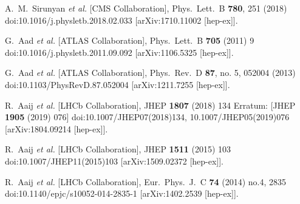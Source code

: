 \documentclass[12pt]{article}
\begin{document}
\begin{thebibliography}{1}
  A.~M.~Sirunyan {\it et al.} [CMS Collaboration],
  Phys.\ Lett.\ B {\bf 780}, 251 (2018)
  doi:10.1016/j.physletb.2018.02.033
  [arXiv:1710.11002 [hep-ex]].


  G.~Aad {\it et al.} [ATLAS Collaboration],
  Phys.\ Lett.\ B {\bf 705} (2011) 9
  doi:10.1016/j.physletb.2011.09.092
  [arXiv:1106.5325 [hep-ex]].

  G.~Aad {\it et al.} [ATLAS Collaboration],
  Phys.\ Rev.\ D {\bf 87}, no. 5, 052004 (2013)
  doi:10.1103/PhysRevD.87.052004
  [arXiv:1211.7255 [hep-ex]].


  R.~Aaij {\it et al.} [LHCb Collaboration],
  JHEP {\bf 1807} (2018) 134
   Erratum: [JHEP {\bf 1905} (2019) 076]
  doi:10.1007/JHEP07(2018)134, 10.1007/JHEP05(2019)076
  [arXiv:1804.09214 [hep-ex]].
  
  R.~Aaij {\it et al.} [LHCb Collaboration],
  JHEP {\bf 1511} (2015) 103
  doi:10.1007/JHEP11(2015)103
  [arXiv:1509.02372 [hep-ex]].

  R.~Aaij {\it et al.} [LHCb Collaboration],
  Eur.\ Phys.\ J.\ C {\bf 74} (2014) no.4,  2835
  doi:10.1140/epjc/s10052-014-2835-1
  [arXiv:1402.2539 [hep-ex]].


\end{thebibliography}
\end{document}
